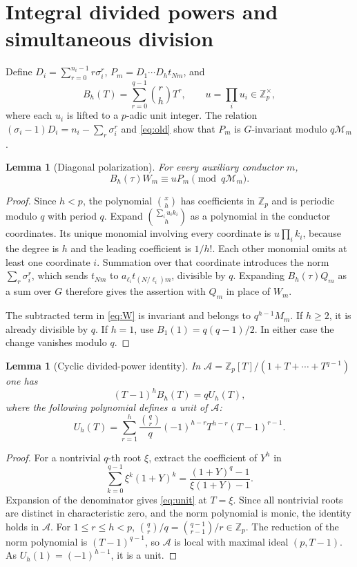 \documentclass[11pt]{article}
\newtheorem{lemma}[theorem]{Lemma}
\theoremstyle{definition}\newtheorem{definition}[theorem]{Definition}
\theoremstyle{remark}\newtheorem{remark}[theorem]{Remark}
\newcommand{\Zp}{\mathbb Z_p}\newcommand{\Qp}{\mathbb Q_p}
\begin{document}
\section{Integral divided powers and simultaneous division}
Define $D_i=\sum_{r=0}^{n_i-1}r\sigma_i^r$, $P_m=D_1\cdots D_ht_{Nm}$, and
\[
 B_h(T)=\sum_{r=0}^{q-1}\binom rhT^r,\qquad u=\prod_i u_i\in\Zp^\times,
\]
where each $u_i$ is lifted to a $p$-adic unit integer. The relation $(\sigma_i-1)D_i=n_i-\sum_r\sigma_i^r$ and \eqref{eq:old} show that $P_m$ is $G$-invariant modulo $q\mathcal M_m$.

\begin{lemma}[Diagonal polarization]\label{lem:polar}
For every auxiliary conductor $m$,
\[
 B_h(\tau)W_m\equiv uP_m\pmod{q\mathcal M_m}.
\]
\end{lemma}
\begin{proof}
Since $h<p$, the polynomial $\binom{x}{h}$ has coefficients in $\Zp$ and is periodic modulo $q$ with period $q$. Expand $\binom{\sum_i u_i k_i}{h}$ as a polynomial in the conductor coordinates. Its unique monomial involving every coordinate is $u\prod_i k_i$, because the degree is $h$ and the leading coefficient is $1/h!$. Each other monomial omits at least one coordinate $i$. Summation over that coordinate introduces the norm $\sum_r\sigma_i^r$, which sends $t_{Nm}$ to $a_{\ell_i}t_{(N/\ell_i)m}$, divisible by $q$. Expanding $B_h(\tau)Q_m$ as a sum over $G$ therefore gives the assertion with $Q_m$ in place of $W_m$.

The subtracted term in \eqref{eq:W} is invariant and belongs to $q^{h-1}M_m$. If $h\ge2$, it is already divisible by $q$. If $h=1$, use $B_1(1)=q(q-1)/2$. In either case the change vanishes modulo $q$.
\end{proof}

\begin{lemma}[Cyclic divided-power identity]\label{lem:unit}
In $\mathcal A=\Zp[T]/(1+T+\cdots+T^{q-1})$ one has
\begin{equation}\label{eq:unit}
 (T-1)^hB_h(T)=qU_h(T),
\end{equation}
where the following polynomial defines a unit of $\mathcal A$:
\[
 U_h(T)=\sum_{r=1}^h\frac{\binom qr}{q}(-1)^{h-r}T^{h-r}(T-1)^{r-1}.
\]
\end{lemma}
\begin{proof}
For a nontrivial $q$-th root $\xi$, extract the coefficient of $Y^h$ in
\[
 \sum_{k=0}^{q-1}\xi^k(1+Y)^k=\frac{(1+Y)^q-1}{\xi(1+Y)-1}.
\]
Expansion of the denominator gives \eqref{eq:unit} at $T=\xi$. Since all nontrivial roots are distinct in characteristic zero, and the norm polynomial is monic, the identity holds in $\mathcal A$. For $1\le r\le h<p$, $\binom qr/q=\binom{q-1}{r-1}/r\in\Zp$. The reduction of the norm polynomial is $(T-1)^{q-1}$, so $\mathcal A$ is local with maximal ideal $(p,T-1)$. As $U_h(1)=(-1)^{h-1}$, it is a unit.
\end{proof}
\end{document}
